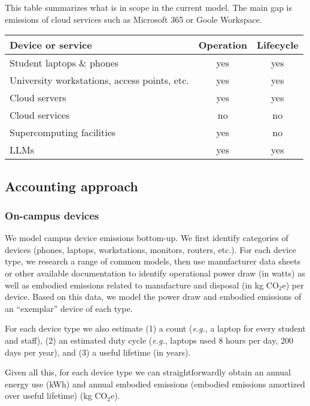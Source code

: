 \documentclass[11pt]{article}
\newcommand{\eg}{{\em e.g.}}
\newcommand{\coe}{CO$_2$e}
\newcommand{\gcoe}{g \coe}
\newcommand{\kgcoe}{k\gcoe}
\begin{document}
This table summarizes what is in scope in the current model. The main gap is emissions of cloud services such as Microsoft 365 or Goole Workspace.

\begin{center}
  \begin{tabular}{|l|c|c|}
  \hline
  \textbf{Device or service} & \textbf{Operation} & \textbf{Lifecycle} \\ \hline
  Student laptops \& phones & yes & yes \\
  University workstations, access points, etc. & yes & yes \\
  Cloud servers & yes & yes \\
  Cloud services & no & no \\
  Supercomputing facilities & yes & no \\
  LLMs & yes & yes \\ \hline
  \end{tabular}
  \label{tab:scopes}
  \end{center}

\subsection{Accounting approach}

\subsubsection*{On-campus devices}

We model campus device emissions bottom-up. We first identify categories of devices (phones, laptops, workstations, monitors, routers, etc.). For each device type, we research a range of common models, then use manufacturer data sheets or other available documentation to identify operational power draw (in watts) as well as embodied emissions related to manufacture and disposal (in \kgcoe) per device. Based on this data, we model the power draw and embodied emissions of an ``exemplar'' device of each type.

For each device type we also estimate (1) a count (\eg, a laptop for every student and staff), (2) an estimated duty cycle (\eg, laptops used 8 hours per day, 200 days per year), and (3) a useful lifetime (in years).

Given all this, for each device type we can straightforwardly obtain an annual energy use (kWh) and annual embodied emissions (embodied emissions amortized over useful lifetime) (\kgcoe).
\end{document}
